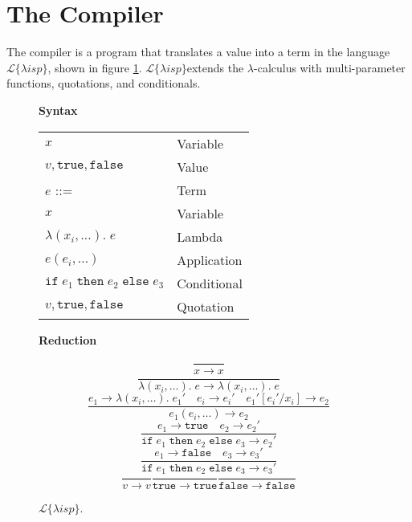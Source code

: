 \documentclass[a4paper]{article}
\newcommand{\lisp}{\ensuremath{\mathcal{L}\{\lambda isp\}}}
\begin{document}
\section{The Compiler}

The compiler is a program that translates a value into a term in the language \lisp, shown in figure \ref{fig:lisp}. \lisp extends the $\lambda$-calculus with multi-parameter functions, quotations, and conditionals.

\begin{figure}[h]
\label{fig:lisp}
\caption{\lisp.}

{\bf Syntax}

\begin{tabular}{ll}
$x$ & Variable \\
$v, \mathtt{true}, \mathtt{false}$ & Value \\
$e$ ::= & Term \\
\hspace{1em} $x$ & \hspace{1em} Variable \\
\hspace{1em} $\lambda(x_i, \dots).\;e$ & \hspace{1em} Lambda \\
\hspace{1em} $e(e_i, \dots)$ & \hspace{1em} Application \\
\hspace{1em} $\mathtt{if}\;e_1\;\mathtt{then}\;e_2\;\mathtt{else}\;e_3$ & \hspace{1em} Conditional \\
\hspace{1em} $v, \mathtt{true}, \mathtt{false}$ & \hspace{1em} Quotation \\
\end{tabular}

\hrulefill

{\bf Reduction}

$$\frac{}{x \rightarrow x}$$
$$\frac{}{\lambda(x_i, \dots).\;e \rightarrow \lambda(x_i, \dots).\;e}$$
$$\frac{e_1 \rightarrow \lambda(x_i, \dots).\;e_1' \quad e_i \rightarrow e_i' \quad e_1'[e_i' / x_i] \rightarrow e_2}{e_1(e_i, \dots) \rightarrow e_2}$$
$$\frac{e_1 \rightarrow \mathtt{true} \quad e_2 \rightarrow e_2'}{\mathtt{if}\;e_1\;\mathtt{then}\;e_2\;\mathtt{else}\;e_3 \rightarrow e_2'}$$
$$\frac{e_1 \rightarrow \mathtt{false} \quad e_3 \rightarrow e_3'}{\mathtt{if}\;e_1\;\mathtt{then}\;e_2\;\mathtt{else}\;e_3 \rightarrow e_3'}$$
$$\frac{}{v \rightarrow v} \frac{}{\mathtt{true} \rightarrow \mathtt{true}} \frac{}{\mathtt{false} \rightarrow \mathtt{false}}$$

\end{figure}
\end{document}
